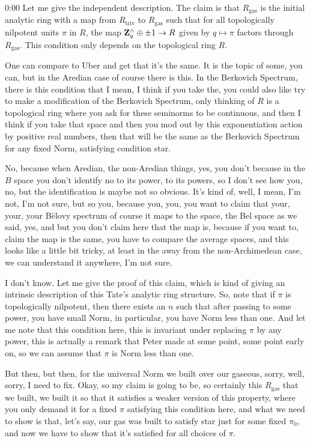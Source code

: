 \begin{unfinished}{0:00}
Let me give the independent description. The claim is that $R_{\text{gas}}$ is the initial analytic ring with a map from $R_{\text{triv}}$ to $R_{\text{gas}}$ such that for all topologically nilpotent units $\pi$ in $R$, the map $\mathbf Z_q^\wedge \oplus \pm 1 \to R$ given by $q \mapsto \pi$ factors through $R_{\text{gas}}$. This condition only depends on the topological ring $R$.

One can compare to Uber and get that it's the same. It is the topic of some, you can, but in the Aredian case of course there is this. In the Berkovich Spectrum, there is this condition that I mean, I think if you take the, you could also like try to make a modification of the Berkovich Spectrum, only thinking of $R$ is a topological ring where you ask for these seminorms to be continuous, and then I think if you take that space and then you mod out by this exponentiation action by positive real numbers, then that will be the same as the Berkovich Spectrum for any fixed Norm, satisfying condition star.

No, because when Aredian, the non-Aredian things, yes, you don't because in the $B$ space you don't identify no to its power, to its powers, so I don't see how you, no, but the identification is maybe not so obvious. It's kind of, well, I mean, I'm not, I'm not sure, but so you, because you, you, you want to claim that your, your, your Bëlovy spectrum of course it maps to the space, the Bel space as we said, yes, and but you don't claim here that the map is, because if you want to, claim the map is the same, you have to compare the average spaces, and this looks like a little bit tricky, at least in the away from the non-Archimedean case, we can understand it anywhere, I'm not sure.

I don't know. Let me give the proof of this claim, which is kind of giving an intrinsic description of this Tate's analytic ring structure. So, note that if $\pi$ is topologically nilpotent, then there exists an $n$ such that after passing to some power, you have small Norm, in particular, you have Norm less than one. And let me note that this condition here, this is invariant under replacing $\pi$ by any power, this is actually a remark that Peter made at some point, some point early on, so we can assume that $\pi$ is Norm less than one.

But then, but then, for the universal Norm we built over our gaseous, sorry, well, sorry, I need to fix. Okay, so my claim is going to be, so certainly this $R_\mathrm{gas}$ that we built, we built it so that it satisfies a weaker version of this property, where you only demand it for a fixed $\pi$ satisfying this condition here, and what we need to show is that, let's say, our gas was built to satisfy star just for some fixed $\pi_0$, and now we have to show that it's satisfied for all choices of $\pi$.


\end{unfinished}
